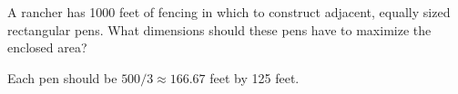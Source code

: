 {A rancher has 1000 feet of fencing in which to construct adjacent, equally sized rectangular pens. What dimensions should these pens have to maximize the enclosed area?

\noindent\begin{minipage}{\linewidth}
\centering{}
\end{minipage}
}
{Each pen should be $500/3\approx 166.67$ feet by 125 feet.
}

